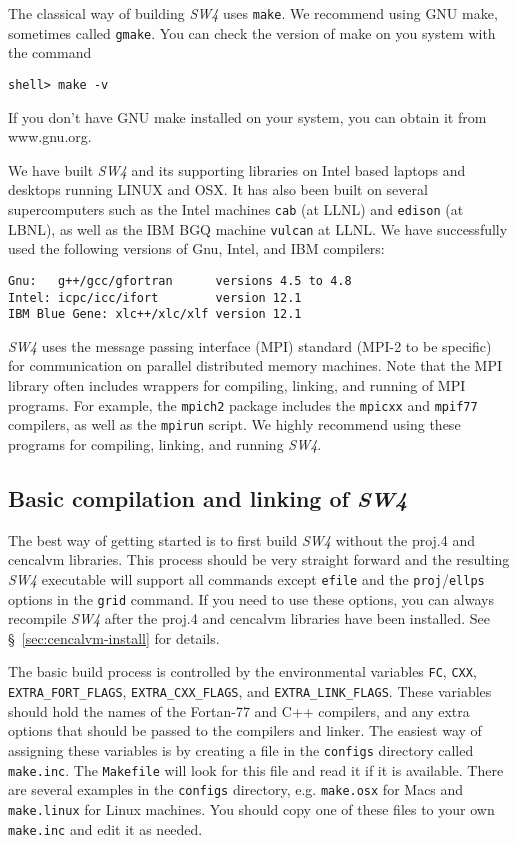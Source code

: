 \documentclass[11pt]{article}
\begin{document}
The classical way of building \emph{SW4} uses \verb+make+. We recommend using GNU make, sometimes called
\verb+gmake+. You can check the version of make on you system with the command
\begin{verbatim}
shell> make -v
\end{verbatim}
If you don't have GNU make installed on your system, you can obtain it from www.gnu.org.

We have built \emph{SW4} and its supporting libraries on Intel based laptops and desktops running
LINUX and OSX. It has also been built on several supercomputers such as the Intel machines {\tt cab}
(at LLNL) and {\tt edison} (at LBNL), as well as the IBM BGQ machine {\tt vulcan} at LLNL. We have
successfully used the following versions of Gnu, Intel, and IBM compilers:
\begin{verbatim}
Gnu:   g++/gcc/gfortran      versions 4.5 to 4.8
Intel: icpc/icc/ifort        version 12.1
IBM Blue Gene: xlc++/xlc/xlf version 12.1
\end{verbatim}

\emph{SW4} uses the message passing interface (MPI) standard (MPI-2 to be specific) for
communication on parallel distributed memory machines. Note that the MPI library often includes
wrappers for compiling, linking, and running of MPI programs. For example, the {\tt mpich2} package
includes the {\tt mpicxx} and {\tt mpif77} compilers, as well as the {\tt mpirun} script. We highly
recommend using these programs for compiling, linking, and running \emph{SW4}.


\subsection{Basic compilation and linking of \emph{SW4}}\label{sec:basic-install}

The best way of getting started is to first build \emph{SW4} without the proj.4 and cencalvm
libraries. This process should be very straight forward and the resulting \emph{SW4} executable
will support all commands except \verb+efile+ and the \verb+proj+/\verb+ellps+ options in the
\verb+grid+ command. If you need to use these options, you can always recompile \emph{SW4} after the
proj.4 and cencalvm libraries have been installed. See \S~\ref{sec:cencalvm-install} for details.

The basic build process is controlled by the environmental variables \verb+FC+, \verb+CXX+,
\verb+EXTRA_FORT_FLAGS+, \verb+EXTRA_CXX_FLAGS+, and \verb+EXTRA_LINK_FLAGS+. These variables should
hold the names of the Fortan-77 and C++ compilers, and any extra options that should be passed to
the compilers and linker. The easiest way of assigning these variables is by creating a file in the
\verb+configs+ directory called \verb+make.inc+. The \verb+Makefile+ will look for this file and
read it if it is available. There are several examples in the \verb+configs+ directory, e.g.
\verb+make.osx+ for Macs and \verb+make.linux+ for Linux machines. You should copy one of these files
to your own \verb+make.inc+ and edit it as needed. 
\end{document}
